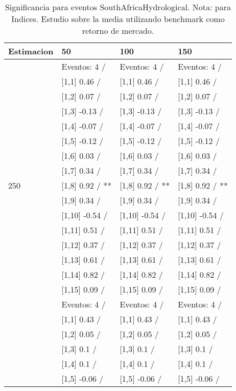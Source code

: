 \begin{table}

\caption{Significancia para eventos SouthAfricaHydrological. Nota: para Indices. Estudio sobre la media utilizando benchmark como retorno de mercado.}
\centering
\begin{tabular}[t]{llll}
\toprule
Estimacion & 50 & 100 & 150\\
\midrule
 & Eventos:  4 / & Eventos:  4 / & Eventos:  4 /\\
 & {}[1,1] 0.46  / & {}[1,1] 0.46  / & {}[1,1] 0.46  /\\
 & {}[1,2] 0.07  / & {}[1,2] 0.07  / & {}[1,2] 0.07  /\\
 & {}[1,3] -0.13  / & {}[1,3] -0.13  / & {}[1,3] -0.13  /\\
 & {}[1,4] -0.07  / & {}[1,4] -0.07  / & {}[1,4] -0.07  /\\
\addlinespace
 & {}[1,5] -0.12  / & {}[1,5] -0.12  / & {}[1,5] -0.12  /\\
 & {}[1,6] 0.03  / & {}[1,6] 0.03  / & {}[1,6] 0.03  /\\
 & {}[1,7] 0.34  / & {}[1,7] 0.34  / & {}[1,7] 0.34  /\\
250 & {}[1,8] 0.92  / ** & {}[1,8] 0.92  / ** & {}[1,8] 0.92  / **\\
 & {}[1,9] 0.34  / & {}[1,9] 0.34  / & {}[1,9] 0.34  /\\
\addlinespace
 & {}[1,10] -0.54  / & {}[1,10] -0.54  / & {}[1,10] -0.54  /\\
 & {}[1,11] 0.51  / & {}[1,11] 0.51  / & {}[1,11] 0.51  /\\
 & {}[1,12] 0.37  / & {}[1,12] 0.37  / & {}[1,12] 0.37  /\\
 & {}[1,13] 0.61  / & {}[1,13] 0.61  / & {}[1,13] 0.61  /\\
 & {}[1,14] 0.82  / & {}[1,14] 0.82  / & {}[1,14] 0.82  /\\
\addlinespace
 & {}[1,15] 0.09  / & {}[1,15] 0.09  / & {}[1,15] 0.09  /\\
 & Eventos:  4 / & Eventos:  4 / & Eventos:  4 /\\
 & {}[1,1] 0.43  / & {}[1,1] 0.43  / & {}[1,1] 0.43  /\\
 & {}[1,2] 0.05  / & {}[1,2] 0.05  / & {}[1,2] 0.05  /\\
 & {}[1,3] 0.1  / & {}[1,3] 0.1  / & {}[1,3] 0.1  /\\
\addlinespace
 & {}[1,4] 0.1  / & {}[1,4] 0.1  / & {}[1,4] 0.1  /\\
 & {}[1,5] -0.06  / & {}[1,5] -0.06  / & {}[1,5] -0.06  /\\

\end{tabular}
\end{table}
